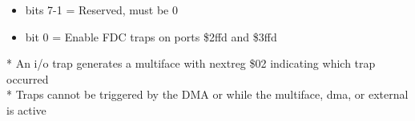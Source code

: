 \begin{itemize}
\item bits 7-1 = Reserved, must be 0
\item bit 0 = Enable FDC traps on ports \$2ffd and \$3ffd
\end{itemize}
* An i/o trap generates a multiface  with nextreg \$02
  indicating which trap occurred\\
* Traps cannot be triggered by the DMA or while the multiface, dma, or
 external  is active

